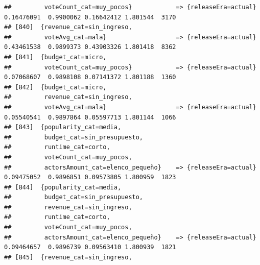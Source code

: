 \documentclass[
]{article}
\begin{document}
\begin{verbatim}
##         voteCount_cat=muy_pocos}            => {releaseEra=actual}               0.16476091  0.9900062 0.16642412 1.801544  3170
## [840]  {revenue_cat=sin_ingreso,                                                                                                
##         voteAvg_cat=mala}                   => {releaseEra=actual}               0.43461538  0.9899373 0.43903326 1.801418  8362
## [841]  {budget_cat=micro,                                                                                                       
##         voteCount_cat=muy_pocos}            => {releaseEra=actual}               0.07068607  0.9898108 0.07141372 1.801188  1360
## [842]  {budget_cat=micro,                                                                                                       
##         revenue_cat=sin_ingreso,                                                                                                
##         voteAvg_cat=mala}                   => {releaseEra=actual}               0.05540541  0.9897864 0.05597713 1.801144  1066
## [843]  {popularity_cat=media,                                                                                                   
##         budget_cat=sin_presupuesto,                                                                                             
##         runtime_cat=corto,                                                                                                      
##         voteCount_cat=muy_pocos,                                                                                                
##         actorsAmount_cat=elenco_pequeño}    => {releaseEra=actual}               0.09475052  0.9896851 0.09573805 1.800959  1823
## [844]  {popularity_cat=media,                                                                                                   
##         budget_cat=sin_presupuesto,                                                                                             
##         revenue_cat=sin_ingreso,                                                                                                
##         runtime_cat=corto,                                                                                                      
##         voteCount_cat=muy_pocos,                                                                                                
##         actorsAmount_cat=elenco_pequeño}    => {releaseEra=actual}               0.09464657  0.9896739 0.09563410 1.800939  1821
## [845]  {revenue_cat=sin_ingreso,                                                                                                

\end{verbatim}
\end{document}
